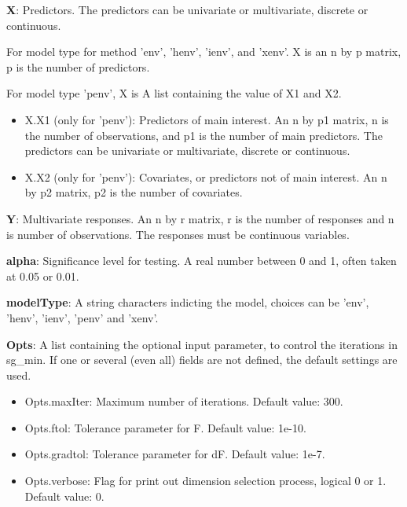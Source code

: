 \documentclass[a4paper,11pt,openany]{memoir}
\begin{document}
\begin{par}
\textbf{X}: Predictors.   The predictors can be univariate or multivariate, discrete or continuous.
\end{par} \vspace{1em}
\begin{par}
For model type for method 'env', 'henv', 'ienv', and 'xenv'. X is an n by p matrix, p is the number of predictors.
\end{par} \vspace{1em}
\begin{par}
For model type 'penv', X is  A list containing the value of X1 and X2.
\end{par} \vspace{1em}
\begin{itemize}
\setlength{\itemsep}{-1ex}
   \item X.X1 (only for 'penv'): Predictors of main interest. An n by p1 matrix, n is the number of observations, and p1 is the number of main predictors. The predictors can be univariate or multivariate, discrete or continuous.
   \item X.X2 (only for 'penv'): Covariates, or predictors not of main interest.  An n by p2 matrix, p2 is the number of covariates.
\end{itemize}
\begin{par}
\textbf{Y}: Multivariate responses. An n by r matrix, r is the number of responses and n is number of observations. The responses must be continuous variables.
\end{par} \vspace{1em}
\begin{par}
\textbf{alpha}: Significance level for testing.  A real number between 0 and 1, often taken at 0.05 or 0.01.
\end{par} \vspace{1em}
\begin{par}
\textbf{modelType}: A string characters indicting the model, choices can be 'env', 'henv', 'ienv', 'penv' and 'xenv'.
\end{par} \vspace{1em}
\begin{par}
\textbf{Opts}: A list containing the optional input parameter, to control the iterations in sg\_min. If one or several (even all) fields are not defined, the default settings are used.
\end{par} \vspace{1em}
\begin{itemize}
\setlength{\itemsep}{-1ex}
   \item Opts.maxIter: Maximum number of iterations.  Default value: 300.
   \item Opts.ftol: Tolerance parameter for F.  Default value: 1e-10.
   \item Opts.gradtol: Tolerance parameter for dF.  Default value: 1e-7.
   \item Opts.verbose: Flag for print out dimension selection process, logical 0 or 1. Default value: 0.
\end{itemize}
\end{document}
